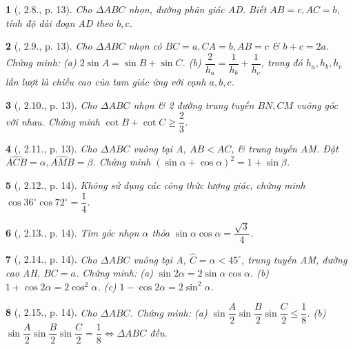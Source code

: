 \documentclass{article}
\newtheorem{baitoan}{}
\begin{document}
\begin{baitoan}[\cite{TLCT_THCS_Toan_9_hinh_hoc}, 2.8., p. 13]
	Cho $\Delta ABC$ nhọn, đường phân giác AD. Biết $AB = c,AC = b$, tính độ dài đoạn AD theo $b,c$.
\end{baitoan}

\begin{baitoan}[\cite{TLCT_THCS_Toan_9_hinh_hoc}, 2.9., p. 13]
	Cho $\Delta ABC$ nhọn có $BC = a,CA = b,AB = c$ \& $b + c = 2a$. Chứng minh: (a) $2\sin A = \sin B + \sin C$. (b) $\dfrac{2}{h_a} = \dfrac{1}{h_b} + \dfrac{1}{h_c}$, trong đó $h_a,h_b,h_c$ lần lượt là chiều cao của tam giác ứng với cạnh $a,b,c$.
\end{baitoan}

\begin{baitoan}[\cite{TLCT_THCS_Toan_9_hinh_hoc}, 2.10., p. 13]
	Cho $\Delta ABC$ nhọn \& 2 đường trung tuyến $BN,CM$ vuông góc với nhau. Chứng minh $\cot B + \cot C\ge\dfrac{2}{3}$.
\end{baitoan}

\begin{baitoan}[\cite{TLCT_THCS_Toan_9_hinh_hoc}, 2.11., p. 13]
	Cho $\Delta ABC$ vuông tại A, $AB < AC$, \& trung tuyến AM. Đặt $\widehat{ACB} = \alpha,\widehat{AMB} = \beta$. Chứng minh $(\sin\alpha + \cos\alpha)^2 = 1 + \sin\beta$.
\end{baitoan}

\begin{baitoan}[\cite{TLCT_THCS_Toan_9_hinh_hoc}, 2.12., p. 14]
	Không sử dụng các công thức lượng giác, chứng minh $\cos36^\circ\cos72^\circ = \dfrac{1}{4}$.
\end{baitoan}

\begin{baitoan}[\cite{TLCT_THCS_Toan_9_hinh_hoc}, 2.13., p. 14]
	Tìm góc nhọn $\alpha$ thỏa $\sin\alpha\cos\alpha = \dfrac{\sqrt{3}}{4}$.
\end{baitoan}

\begin{baitoan}[\cite{TLCT_THCS_Toan_9_hinh_hoc}, 2.14., p. 14]
	Cho $\Delta ABC$ vuông tại A, $\widehat{C} = \alpha < 45^\circ$, trung tuyến AM, đường cao AH, $BC = a$. Chứng minh: (a) $\sin2\alpha = 2\sin\alpha\cos\alpha$. (b) $1 + \cos2\alpha = 2\cos^2\alpha$. (c) $1 - \cos2\alpha = 2\sin^2\alpha$.
\end{baitoan}

\begin{baitoan}[\cite{TLCT_THCS_Toan_9_hinh_hoc}, 2.15., p. 14]
	Cho $\Delta ABC$. Chứng minh: (a) $\sin\dfrac{A}{2}\sin\dfrac{B}{2}\sin\dfrac{C}{2}\le\dfrac{1}{8}$. (b) $\sin\dfrac{A}{2}\sin\dfrac{B}{2}\sin\dfrac{C}{2} = \dfrac{1}{8}\Leftrightarrow\Delta ABC$ đều.
\end{baitoan}
\end{document}
